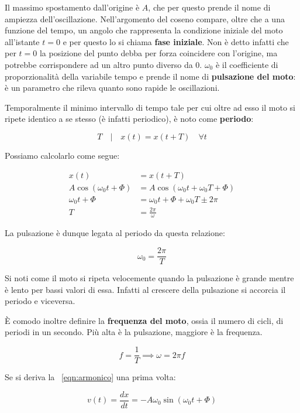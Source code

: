 Il massimo spostamento dall'origine è $A$, che per questo prende il nome di ampiezza dell'oscillazione. Nell'argomento del coseno compare, oltre che a una funzione del tempo, un angolo che rappresenta la condizione iniziale del moto all'istante $t=0$ e per questo lo si chiama \textbf{fase iniziale}. Non è detto infatti che per $t=0$ la posizione del punto debba per forza coincidere con l'origine, ma potrebbe corrispondere ad un altro punto diverso da $0$. $\omega_0$ è il coefficiente di proporzionalità della variabile tempo e prende il nome di \textbf{pulsazione del moto}: è un parametro che rileva quanto sono rapide le oscillazioni.

Temporalmente il minimo intervallo di tempo tale per cui oltre ad esso il moto si ripete identico a se stesso (è infatti periodico),  è noto come \textbf{periodo}:

\[
	T \quad | \quad x(t)=x(t+T) \quad \forall t
\]

Possiamo calcolarlo come segue:

\begin{align*}
	x(t) &= x(t+T) \\
	A\cos(\omega_0 t+\Phi) &= A\cos(\omega_0 t +\omega_0 T+\Phi) \\
	\omega_0 t+\Phi &= \omega_0 t+\Phi+\omega_0 T \pm 2\pi \\
	T &= \frac{2\pi}{\omega}
\end{align*}

La pulsazione è dunque legata al periodo da questa relazione:

\[
	\boxed{\omega_0=\frac{2\pi}{T}}
\]

Si noti come il moto si ripeta velocemente quando la pulsazione è grande mentre è lento per bassi valori di essa. Infatti al crescere della pulsazione si accorcia il periodo e viceversa.

È comodo inoltre definire la \textbf{frequenza del moto}, ossia il numero di cicli, di periodi in un secondo. Più alta è la pulsazione, maggiore è la frequenza.

\[
	\boxed{f=\frac{1}{T}} \implies \boxed{\omega=2\pi f}
\]

Se si deriva la ~\eqref{eqn:armonico} una prima volta:

\[
	v(t)=\frac{dx}{dt}=-A\omega_0\sin(\omega_0 t+\Phi)
\]


